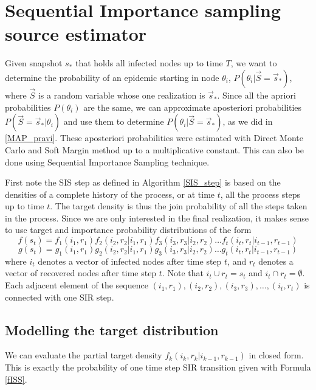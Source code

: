 \documentclass[times, utf8, diplomski]{fer}
\begin{document}
\section{Sequential Importance sampling source estimator}
Given snapshot $s_*$ that holds all infected nodes up to time $T$, we want to determine the probability  of an epidemic starting in node $\theta_i$, $P(\theta_i | \vec S = \vec s_*)$, where $\vec S$ is a random variable whose one realization is $\vec s_*$.   Since all the apriori probabilities $P(\theta_i)$ are the same, we can approximate aposteriori probabilities $P(\vec S = \vec s_* | \theta_i)$ and use them to determine $P(\theta_i | \vec S = \vec s_*)$, as we did in \ref{MAP_pravi}. These aposteriori probabilities were estimated with Direct Monte Carlo and Soft Margin method up to a multiplicative constant. This can also be done using Sequential Importance Sampling technique.

First note the SIS step as defined in Algorithm \ref{SIS_step} is based on the densities of a complete history of the process, or at time $t$, all the process steps up to time $t$. The target density is thus the join probability of all the steps taken in the process. Since we are only interested  in the final realization, it makes sense to use target and importance probability distributions  of the form
\begin{equation}
f(s_t) = f_1(i_1, r_1) f_2(i_2, r_2 | i_1, r_1)  f_3(i_3, r_3 | i_2, r_2)  \ldots  f_t(i_t, r_t | i_{t - 1}, r_{t - 1})
\end{equation}
\begin{equation}
g(s_t) = g_1(i_1, r_1) g_2(i_2, r_2 | i_1, r_1) g_3(i_3, r_3 | i_2, r_2) \ldots  g_t(i_t, r_t | i_{t - 1}, r_{t - 1})
\end{equation}
where $i_t$ denotes a vector of infected nodes after time step $t$, and $r_t$ denotes a vector of recovered nodes after time step $t$. Note that $i_t \cup r_t = s_t$ and $i_t \cap r_t = \emptyset$. Each adjacent element of the sequence $(i_1, r_1), (i_2, r_2), (i_3, r_3), \ldots, (i_t, r_t)$ is connected with one SIR step.

\subsection{Modelling the target distribution}
We can evaluate the partial target density $f_k(i_k, r_k | i_{k - 1}, r_{k - 1})$ in closed form. This is exactly the probability of one time step SIR transition given with Formula \ref{fISS}.
\end{document}
